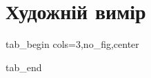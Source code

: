  
 
 
 
 
\section{Художній вимір}
\label{sec:topics.vojna.pics}


\ifcmt
  tab_begin cols=3,no_fig,center

  tab_end
\fi
